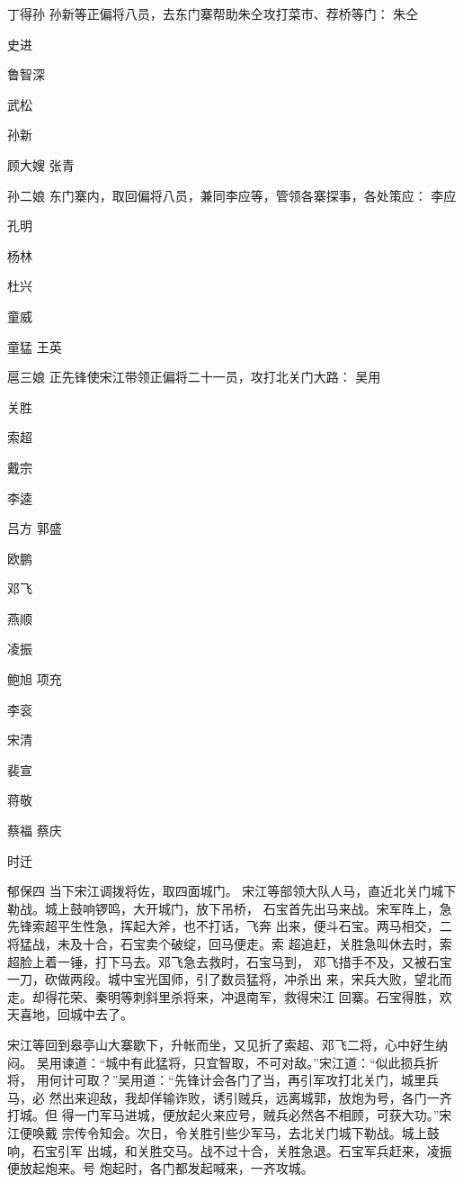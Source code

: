 丁得孙
孙新等正偏将八员，去东门寨帮助朱仝攻打菜市、荐桥等门：
朱仝

史进

鲁智深

武松

孙新

顾大嫂
张青

孙二娘
东门寨内，取回偏将八员，兼同李应等，管领各寨探事，各处策应：
李应

孔明

杨林

杜兴

童威

童猛
王英

扈三娘
正先锋使宋江带领正偏将二十一员，攻打北关门大路：
吴用

关胜

索超

戴宗

李逵

吕方
郭盛

欧鹏

邓飞

燕顺

凌振

鲍旭
项充

李衮

宋清

裴宣

蒋敬

蔡福
蔡庆

时迁

郁保四
当下宋江调拨将佐，取四面城门。
宋江等部领大队人马，直近北关门城下勒战。城上鼓响锣鸣，大开城门，放下吊桥，
石宝首先出马来战。宋军阵上，急先锋索超平生性急，挥起大斧，也不打话，飞奔
出来，便斗石宝。两马相交，二将猛战，未及十合，石宝卖个破绽，回马便走。索
超追赶，关胜急叫休去时，索超脸上着一锤，打下马去。邓飞急去救时，石宝马到，
邓飞措手不及，又被石宝一刀，砍做两段。城中宝光国师，引了数员猛将，冲杀出
来，宋兵大败，望北而走。却得花荣、秦明等刺斜里杀将来，冲退南军，救得宋江
回寨。石宝得胜，欢天喜地，回城中去了。

宋江等回到皋亭山大寨歇下，升帐而坐，又见折了索超、邓飞二将，心中好生纳闷。
吴用谏道：“城中有此猛将，只宜智取，不可对敌。”宋江道：“似此损兵折将，
用何计可取？”吴用道：“先锋计会各门了当，再引军攻打北关门，城里兵马，必
然出来迎敌，我却佯输诈败，诱引贼兵，远离城郭，放炮为号，各门一齐打城。但
得一门军马进城，便放起火来应号，贼兵必然各不相顾，可获大功。”宋江便唤戴
宗传令知会。次日，令关胜引些少军马，去北关门城下勒战。城上鼓响，石宝引军
出城，和关胜交马。战不过十合，关胜急退。石宝军兵赶来，凌振便放起炮来。号
炮起时，各门都发起喊来，一齐攻城。

